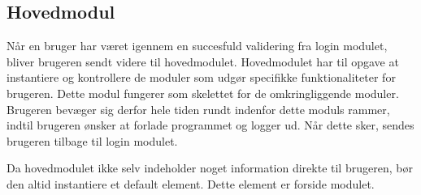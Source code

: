 \subsection{Hovedmodul}
\label{sub:hovedmodul}

Når en bruger har været igennem en succesfuld validering fra login modulet, bliver brugeren sendt videre til hovedmodulet. Hovedmodulet har til opgave at instantiere og kontrollere de moduler som udgør specifikke funktionaliteter for brugeren. Dette modul fungerer som skelettet for de omkringliggende moduler. Brugeren bevæger sig derfor hele tiden rundt indenfor dette moduls rammer, indtil brugeren ønsker at forlade programmet og logger ud. Når dette sker, sendes brugeren tilbage til login modulet. 

Da hovedmodulet ikke selv indeholder noget information direkte til brugeren, bør den altid instantiere et default element. Dette element er forside modulet.

